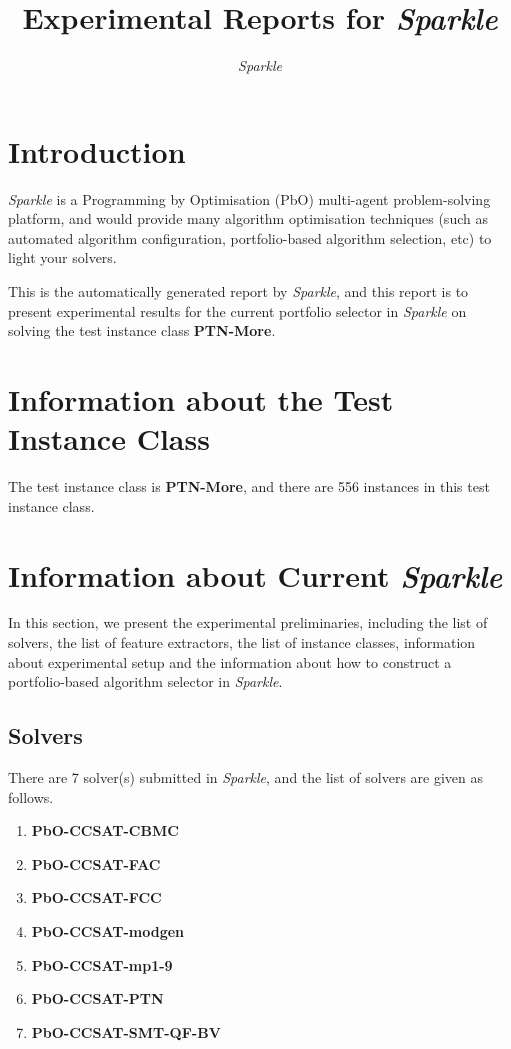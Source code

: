 \documentclass[british]{article}
\title{Experimental Reports for \emph{Sparkle} }
\author{ \emph{Sparkle} }
\begin{document}
\maketitle %


\section{Introduction}
\label{sec:Introduction}

\emph{Sparkle} \cite{Hoos15} is a Programming by Optimisation (PbO) \cite{Hoos12} multi-agent problem-solving platform, and would provide many algorithm optimisation techniques (such as automated algorithm configuration, portfolio-based algorithm selection, etc) to light your solvers. 

This is the automatically generated report by \emph{Sparkle}, and this report is to present experimental results for the current portfolio selector in \emph{Sparkle} on solving the test instance class \textbf{PTN-More}.


\section{Information about the Test Instance Class}
\label{sec:Information_about_the_Test_Instance_Class}

The test instance class is \textbf{PTN-More}, and there are 556 instances in this test instance class.


\section{Information about Current \emph{Sparkle}}
\label{sec:Information_about_Current_Sparkle}

In this section, we present the experimental preliminaries, including the list of solvers, the list of feature extractors, the list of instance classes, information about experimental setup and the information about how to construct a portfolio-based algorithm selector in \emph{Sparkle}.

\subsection{Solvers}
\label{sec:Solvers}
There are 7 solver(s) submitted in \emph{Sparkle}, and the list of solvers are given as follows.


\begin{enumerate} 
\item \textbf{PbO-CCSAT-CBMC}
\item \textbf{PbO-CCSAT-FAC}
\item \textbf{PbO-CCSAT-FCC}
\item \textbf{PbO-CCSAT-modgen}
\item \textbf{PbO-CCSAT-mp1-9}
\item \textbf{PbO-CCSAT-PTN}
\item \textbf{PbO-CCSAT-SMT-QF-BV}

\end{enumerate}
\end{document}
